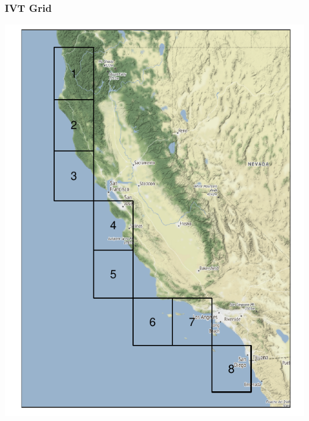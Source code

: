 \documentclass[aspectratio=169,10pt]{beamer}
\newlength{\frametextheight}
\begin{document}
\begin{frame}
    \frametitle{IVT Grid}
    \begin{minipage}{.49\textwidth}
    \centering
    \includegraphics[height=\frametextheight]{./ch1/images/erai_grid}
  \end{minipage}
  \begin{minipage}{.49\textwidth}
    \centering

\end{minipage}
\end{frame}
\end{document}
